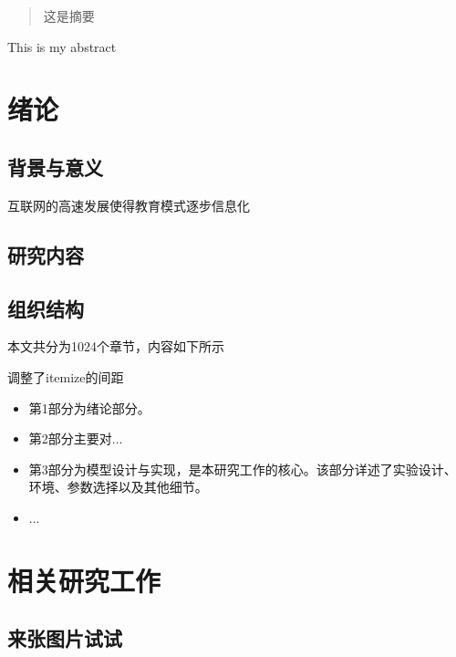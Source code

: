 \documentclass{ecnuthesis}
\begin{document}
\frontmatter

\begin{abstract}
  
 这是摘要
\end{abstract}

\begin{abstractEN}
  
 This is my abstract
\end{abstractEN}

\mainmatter

\chapter{绪论}
\section{背景与意义}
互联网的高速发展使得教育模式逐步信息化


\section{研究内容}


\section{组织结构}
本文共分为1024个章节，内容如下所示

调整了itemize的间距
\begin{itemize}
    \item 第1部分为绪论部分。
    \item 第2部分主要对...
    \item 第3部分为模型设计与实现，是本研究工作的核心。该部分详述了实验设计、环境、参数选择以及其他细节。
    \item ...
\end{itemize}

\chapter{相关研究工作}

\section{来张图片试试}
\end{document}

